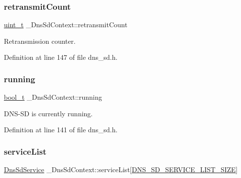 \mbox{\label{struct__DnsSdContext_a8dbf8deb74cf7b21692d32ae0378acc0}} 
\subsubsection{\texorpdfstring{retransmit\+Count}{retransmitCount}}
{\footnotesize\ttfamily \hyperlink{compiler__port_8h_a12a1e9b3ce141648783a82445d02b58d}{uint\+\_\+t} \+\_\+\+Dns\+Sd\+Context\+::retransmit\+Count}



Retransmission counter. 



Definition at line 147 of file dns\+\_\+sd.\+h.

\mbox{\label{struct__DnsSdContext_a66e7dca1a086af68de08bd998649dd35}} 
\subsubsection{\texorpdfstring{running}{running}}
{\footnotesize\ttfamily \hyperlink{compiler__port_8h_a812d16e5494522586b3784e55d479912}{bool\+\_\+t} \+\_\+\+Dns\+Sd\+Context\+::running}



D\+N\+S-\/\+SD is currently running. 



Definition at line 141 of file dns\+\_\+sd.\+h.

\mbox{\label{struct__DnsSdContext_aaa1a4ec82fd56cbe5cfae79cf6485fd8}} 
\subsubsection{\texorpdfstring{service\+List}{serviceList}}
{\footnotesize\ttfamily \hyperlink{structDnsSdService}{Dns\+Sd\+Service} \+\_\+\+Dns\+Sd\+Context\+::service\+List\mbox{[}\hyperlink{dns__sd_8h_a561a3da46162838063fd14c5135d01c7}{D\+N\+S\+\_\+\+S\+D\+\_\+\+S\+E\+R\+V\+I\+C\+E\+\_\+\+L\+I\+S\+T\+\_\+\+S\+I\+ZE}\mbox{]}}




